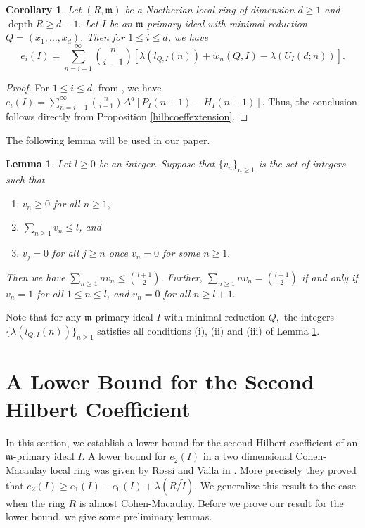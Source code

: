 \documentclass[reqno,a4paper,dvipsnames]{amsart}
\newcommand{\m}{\mathfrak{m} }
\newcommand{\depth}{\operatorname{depth}}
\newtheorem{corollary}[theorem]{Corollary}
\newtheorem{lemma}[theorem]{Lemma}
\theoremstyle{definition}
\begin{document}
\begin{corollary}\label{e_i}
      Let $(R,\m)$ be a Noetherian local ring of dimension $d \geq 1$ and $\depth R \geq d-1.$ Let $I$ be an $\m$-primary ideal with minimal reduction $Q=(x_{1},\ldots,x_{d})$. Then  for $1\leq i\leq d$, we have 
    \[e_{i}(I)=\displaystyle \sum_{n=i-1}^{\infty}\binom{n}{i-1}\left[ \lambda(l_{Q,I}(n))+w_{n}(Q,I)-\lambda(U_{I}(d;n))\right].\]
\end{corollary}
\begin{proof}
  For $1\leq i \leq d$, from \cite[Proposition 2.9]{sam}, we have $e_{i}(I)=\displaystyle \sum_{n=i-1}^{\infty}\binom{n}{i-1} \Delta^{d}[P_{I}(n+1)-H_{I}(n+1)]$. Thus, the conclusion follows  directly from Proposition \ref{hilbcoeffextension}.
\end{proof}




The following lemma will be used in  our paper. 
\begin{lemma} \label{ozekinumericallemma}
\cite[Lemma 3.1]{ozeki}
 Let $l \geq 0$ be an integer. Suppose that $\{v_{n}\}_{n \geq 1}$ is the set of integers such that
 \begin{enumerate}[\normalfont(i)]
     \item $v_{n} \geq 0$ for all $n \geq 1,$
     \item $\displaystyle\sum_{n \geq 1}v_{n} \leq l$, and
     \item $v_{j}=0$ for all $j \geq n$ once $v_{n}=0$ for some $n \geq 1.$
 \end{enumerate}
Then we have $\displaystyle \sum_{n\geq 1}nv_{n} \leq \binom{l+1}{2}$. Further,  $\displaystyle \sum_{n\geq 1}nv_{n} = \binom{l+1}{2}$ if and only if $v_{n}=1$ for all $1 \leq n \leq l$, and $v_{n}=0$ for all $n \geq l+1.$  
\end{lemma}
   Note that for any $\m$-primary ideal $I$ with minimal reduction $Q,$ the  integers $\{\lambda(l_{Q,I}(n))\}_{n \geq 1}$ satisfies all conditions (i), (ii) and (iii) of Lemma \ref{ozekinumericallemma}.

\section{A Lower Bound for the Second Hilbert Coefficient} \label{section3}

In this section,  we establish a lower  bound for  the second Hilbert coefficient of an $\m$-primary ideal $I$.  
A lower bound for  $e_2(I)$ in a two dimensional Cohen-Macaulay local ring  was given by Rossi and Valla in  \cite[Theorem~3.1(a)]{rv}.  More precisely they proved that   $e_2(I) \geq e_1(I) - e_0(I) + \lambda( R/\widetilde{I})$.  We generalize this result to the case when the ring $R$ is almost Cohen-Macaulay. 
Before we prove our result for the lower bound, we give some preliminary lemmas. 
\end{document}
